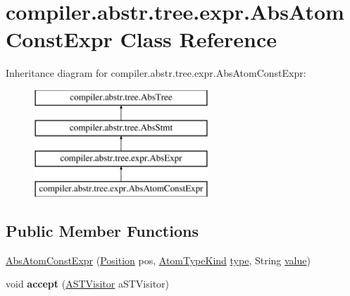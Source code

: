 \hypertarget{classcompiler_1_1abstr_1_1tree_1_1expr_1_1_abs_atom_const_expr}{}\section{compiler.\+abstr.\+tree.\+expr.\+Abs\+Atom\+Const\+Expr Class Reference}
\label{classcompiler_1_1abstr_1_1tree_1_1expr_1_1_abs_atom_const_expr}
Inheritance diagram for compiler.\+abstr.\+tree.\+expr.\+Abs\+Atom\+Const\+Expr\+:\begin{figure}[H]
\begin{center}
\leavevmode
\includegraphics[height=4.000000cm]{classcompiler_1_1abstr_1_1tree_1_1expr_1_1_abs_atom_const_expr}
\end{center}
\end{figure}
\subsection*{Public Member Functions}
\begin{DoxyCompactItemize}
\item 
\hyperlink{classcompiler_1_1abstr_1_1tree_1_1expr_1_1_abs_atom_const_expr_ac6711159c05c9e0d081dd60f68ab6840}{Abs\+Atom\+Const\+Expr} (\hyperlink{classcompiler_1_1_position}{Position} pos, \hyperlink{enumcompiler_1_1abstr_1_1tree_1_1_atom_type_kind}{Atom\+Type\+Kind} \hyperlink{classcompiler_1_1abstr_1_1tree_1_1expr_1_1_abs_atom_const_expr_ad0bfe3939cbe71d74cf30de82c8761a2}{type}, String \hyperlink{classcompiler_1_1abstr_1_1tree_1_1expr_1_1_abs_atom_const_expr_aaae9172cd38db88a712ccd243261656a}{value})
\item 
\mbox{\label{classcompiler_1_1abstr_1_1tree_1_1expr_1_1_abs_atom_const_expr_a4b5e92cc7f34546d85dae926bb140e81}} 
void {\bfseries accept} (\hyperlink{interfacecompiler_1_1abstr_1_1_a_s_t_visitor}{A\+S\+T\+Visitor} a\+S\+T\+Visitor)
\end{DoxyCompactItemize}
